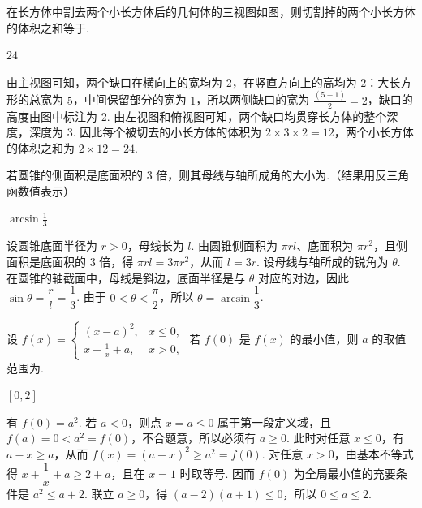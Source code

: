 \begin{problem}
在长方体中割去两个小长方体后的几何体的三视图如图，则切割掉的两个小长方体的体积之和等于\fillinblank{}.


\begin{answer}
\(24\)
\end{answer}

\begin{solution}
由主视图可知，两个缺口在横向上的宽均为 \(2\)，在竖直方向上的高均为 \(2\)：大长方形的总宽为 \(5\)，中间保留部分的宽为 \(1\)，所以两侧缺口的宽为 \(\frac{(5-1)}{2}=2\)，缺口的高度由图中标注为 \(2\). 由左视图和俯视图可知，两个缺口均贯穿长方体的整个深度，深度为 \(3\). 因此每个被切去的小长方体的体积为 \(2\times3\times2=12\)，两个小长方体的体积之和为 \(2\times12=24\).
\end{solution}
\end{problem}

\begin{problem}
若圆锥的侧面积是底面积的 \(3\) 倍，则其母线与轴所成角的大小为\fillinblank{}.（结果用反三角函数值表示）

\begin{answer}
\(\arcsin\frac{1}{3}\)
\end{answer}

\begin{solution}
设圆锥底面半径为 \(r>0\)，母线长为 \(l\). 由圆锥侧面积为 \(\pi rl\)、底面积为 \(\pi r^2\)，且侧面积是底面积的 \(3\) 倍，得 \(\pi rl=3\pi r^2\)，从而 \(l=3r\). 设母线与轴所成的锐角为 \(\theta\). 在圆锥的轴截面中，母线是斜边，底面半径是与 \(\theta\) 对应的对边，因此 \(\sin\theta=\dfrac r l=\dfrac13\). 由于 \(0<\theta<\dfrac\pi2\)，所以 \(\theta=\arcsin\dfrac13\).
\end{solution}
\end{problem}

\begin{problem}
设 \( f(x) = \begin{cases}
(x - a)^2, & x \leqslant 0,\\
x + \frac{1}{x} + a, & x > 0,
\end{cases} \) 若 \( f(0) \) 是 \( f(x) \) 的最小值，则 \( a \) 的取值范围为\fillinblank{}.

\begin{answer}
\(\left[0,2\right]\)
\end{answer}

\begin{solution}
有 \(f(0)=a^2\). 若 \(a<0\)，则点 \(x=a\leqslant0\) 属于第一段定义域，且 \(f(a)=0<a^2=f(0)\)，不合题意，所以必须有 \(a\geqslant0\). 此时对任意 \(x\leqslant0\)，有 \(a-x\geqslant a\)，从而 \(f(x)=(a-x)^2\geqslant a^2=f(0)\). 对任意 \(x>0\)，由基本不等式得 \(x+\dfrac1x+a\geqslant2+a\)，且在 \(x=1\) 时取等号. 因而 \(f(0)\) 为全局最小值的充要条件是 \(a^2\leqslant a+2\). 联立 \(a\geqslant0\)，得 \((a-2)(a+1)\leqslant0\)，所以 \(0\leqslant a\leqslant2\).
\end{solution}
\end{problem}

